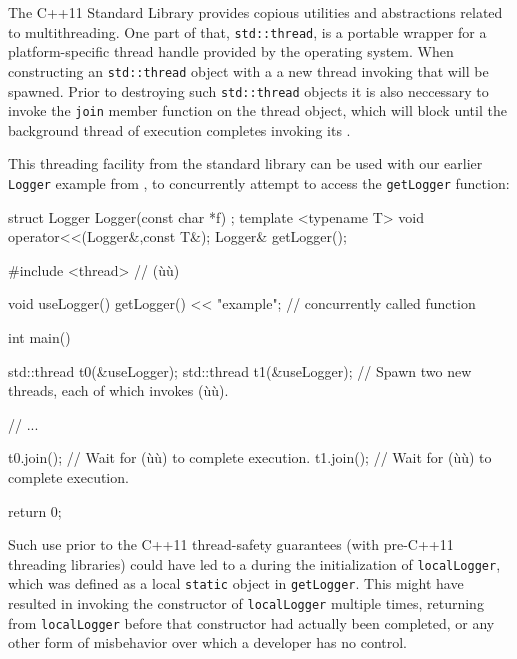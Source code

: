 The C++11 Standard Library provides copious utilities and abstractions related
to multithreading. One part of that, \lstinline!std::thread!, is a portable
wrapper for a platform-specific thread handle provided by the
operating system. When constructing an \lstinline!std::thread! object
with a  a new thread
invoking that  will be spawned.   Prior to destroying such
\lstinline!std::thread! objects it is also neccessary to invoke the
\lstinline!join! member function on the thread object, which will block until
the background thread of execution completes invoking its .

This threading facility from the standard library can be used
with our earlier \lstinline!Logger! example from ,
to concurrently attempt to access the \lstinline!getLogger! function:

\begin{emcppshiddenlisting}[emcppsbatch={e6,e15}]
struct Logger {
  Logger(const char *f) {}
};
template <typename T>
void operator<<(Logger&,const T&);
Logger& getLogger();
\end{emcppshiddenlisting}
\begin{emcppslisting}[emcppsbatch=e6]
#include <thread>  // (ù{}ù)

void useLogger() { getLogger() << "example"; }  // concurrently called function

int main()
{
    std::thread t0(&useLogger);
    std::thread t1(&useLogger);
        // Spawn two new threads, each of which invokes (ù{}ù).

    // ...

    t0.join();  // Wait for (ù{}ù) to complete execution.
    t1.join();  // Wait for (ù{}ù) to complete execution.

    return 0;
}
\end{emcppslisting}

Such use prior to the C++11 thread-safety guarantees (with pre-C++11 threading libraries) could
have led to a  during the initialization of
\lstinline!localLogger!, which was defined as a local \lstinline!static!
object in \lstinline!getLogger!.   This  might have resulted in
invoking the constructor of \lstinline!localLogger! multiple times, returning from
\lstinline!localLogger! before that constructor had actually been completed, or
any other form of misbehavior over which a developer has no control.

